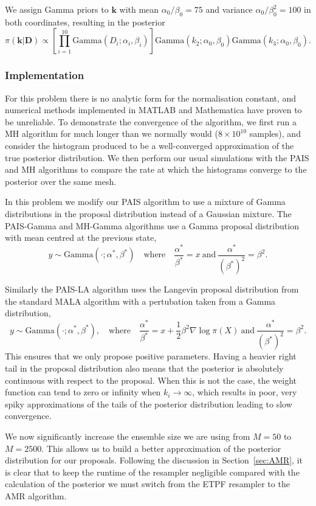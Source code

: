 \documentclass[final]{siamltex}
\begin{document}
We assign Gamma priors to $\mathbf{k}$ with mean $\alpha_0/\beta_0 =
75$ and variance $\alpha_0/\beta_0^2 = 100$ in both coordinates, resulting in the posterior
\[
	\pi(\mathbf{k}|\mathbf{D}) \propto \left[\prod\limits_{i=1}^{10} \text{Gamma}(D_i; \alpha_i, \beta_i)\right]\text{Gamma}(k_2; \alpha_0, \beta_0)\text{Gamma}(k_3; \alpha_0, \beta_0).
\]

\subsubsection{Implementation}\label{sec:chem_implementation}
For this problem there is no analytic form for the normalisation
constant, and numerical methods implemented in MATLAB and Mathematica
have proven to be unreliable. To demonstrate the convergence of the
algorithm, we first run a MH algorithm for much longer than we
normally would ($8\times 10^{10}$ samples), and consider the histogram
produced to be a well-converged approximation of the true posterior
distribution. We then perform our usual simulations with the PAIS and
MH algorithms to compare the rate at which the histograms converge to
the posterior over the same mesh.

In this problem we modify our PAIS algorithm to use a mixture of Gamma
distributions in the proposal distribution instead of a Gaussian
mixture. The PAIS-Gamma and MH-Gamma algorithms use a Gamma
proposal distribution with mean centred at the previous state,
\[
	y \sim \text{Gamma}(\cdot;\alpha^*, \beta^*) \quad \text{where} \quad \frac{\alpha^*}{\beta^*} = x \ \text{and} \ \frac{\alpha^*}{(\beta^*)^2} = \beta^2.
\]

Similarly the PAIS-LA algorithm uses the Langevin proposal distribution
from the standard MALA algorithm with a pertubation taken from a Gamma
distribution,
\[
	y \sim \text{Gamma}(\cdot; \alpha^*, \beta^*), \quad \text{where} \quad \frac{\alpha^*}{\beta^*} = x+\frac{1}{2}\beta^2\nabla\log\pi(X) \ \text{and} \ \frac{\alpha^*}{(\beta^*)^2} = \beta^2.
\]
This ensures that we only propose positive
parameters. Having a heavier right tail in the proposal distribution
also means that the posterior is absolutely continuous with respect to
the proposal. When this is not the case, the weight function can tend
to zero or infinity when $k_i \rightarrow \infty$, which results in
poor, very spiky approximations of the tails of the posterior distribution leading to slow convergence.

We now significantly increase the ensemble size we are using from $M=50$ to $M=2500$. This allows us to build a better approximation of the posterior distribution for our proposals. Following the discussion in Section~\ref{sec:AMR}, it is clear that to keep the runtime of the resampler negligible compared with the calculation of the posterior we must switch from the ETPF resampler to the AMR algorithm.
\end{document}
